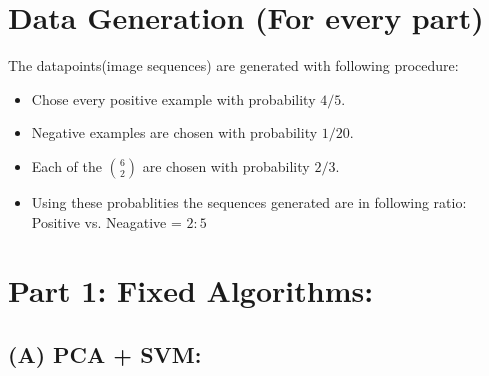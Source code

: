 \documentclass[a4 paper]{article}
\begin{document}

\section*{Data Generation (For every part)}
The datapoints(image sequences) are generated with following procedure:
\begin{itemize}
    \item Chose every positive example with probability $4/5$.
    \item Negative examples are chosen with probability $1/20$.
    \item Each of the $6 \choose 2$ are chosen with probability $2/3$.
    \item Using these probablities the sequences generated are in following ratio:
    Positive vs. Neagative = $2:5$
\end{itemize}

\section*{Part 1: Fixed Algorithms:}
\subsection*{(A) PCA + SVM:}
\end{document}
